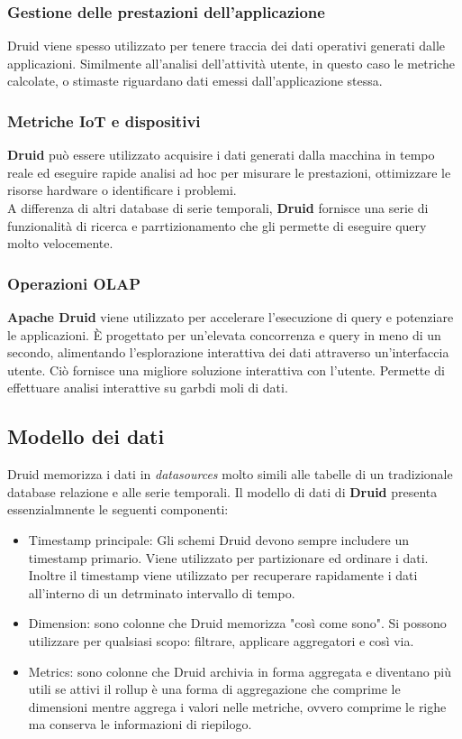 \documentclass{article}
\begin{document}
\subsubsection{Gestione delle prestazioni dell'applicazione}
Druid viene spesso utilizzato per tenere traccia dei dati operativi generati dalle applicazioni.
Similmente all'analisi dell'attività utente, in questo caso le metriche calcolate, o stimaste riguardano dati emessi dall'applicazione stessa.
\subsubsection{Metriche IoT e dispositivi}
\textbf{Druid} può essere utilizzato acquisire i dati generati dalla macchina in tempo reale ed eseguire rapide analisi ad hoc per misurare le prestazioni, ottimizzare le risorse hardware o identificare i problemi.\\
A differenza di altri database di serie temporali, \textbf{Druid} fornisce una serie di funzionalità di ricerca e parrtizionamento che gli permette di eseguire query molto velocemente.
\subsubsection{Operazioni OLAP}
\textbf{Apache Druid} viene utilizzato per accelerare l'esecuzione di query e potenziare le applicazioni. È progettato per un'elevata concorrenza e query in meno di un secondo, alimentando l'esplorazione interattiva dei dati attraverso un'interfaccia utente. Ciò fornisce una migliore soluzione interattiva con l'utente. Permette di effettuare analisi interattive su garbdi moli di dati.
\subsection{Modello dei dati}
Druid memorizza i dati in \textit{datasources} molto simili alle tabelle di un tradizionale database relazione e alle serie temporali.
Il modello di dati di \textbf{Druid} presenta essenzialmnente le seguenti componenti:
\begin{itemize}
    \item Timestamp principale: Gli schemi Druid devono sempre includere un timestamp primario. Viene utilizzato per partizionare ed ordinare i dati. Inoltre il timestamp viene utilizzato per recuperare rapidamente i dati all'interno di un detrminato intervallo di tempo.
    \item Dimension: sono colonne che Druid memorizza "così come sono". Si possono utilizzare per qualsiasi scopo: filtrare, applicare aggregatori e così via.
    \item Metrics: sono colonne che Druid archivia in forma aggregata e diventano più utili se attivi il rollup è una forma di aggregazione che comprime le dimensioni mentre aggrega i valori nelle metriche, ovvero comprime le righe ma conserva le informazioni di riepilogo.
\end{itemize}
\end{document}
